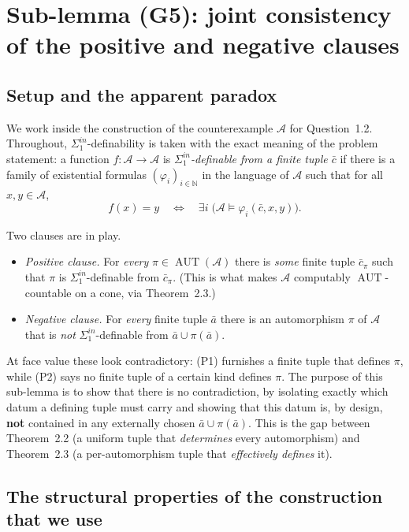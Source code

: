 \documentclass[12pt,fullpage]{article}
\theoremstyle{definition}
\newcommand{\A}{\mathcal{A}}
\newcommand{\N}{\mathbb{N}}
\newcommand{\AUT}{\operatorname{AUT}}
\renewcommand{\phi}{\varphi}
\begin{document}
\section*{Sub-lemma (G5): joint consistency of the positive and negative clauses}

\subsection*{Setup and the apparent paradox}

We work inside the construction of the counterexample $\A$ for
Question~1.2.  Throughout, $\Sigma^{in}_1$-definability is taken with the
exact meaning of the problem statement: a function $f\colon\A\to\A$ is
\emph{$\Sigma^{in}_1$-definable from a finite tuple $\bar c$} if there is a
family of existential formulas $(\phi_i)_{i\in\N}$ in the language of $\A$
such that for all $x,y\in\A$,
\[
f(x)=y\quad\Longleftrightarrow\quad \exists i\;\bigl(\A\models\phi_i(\bar c,x,y)\bigr).
\tag{$\ast$}
\]

Two clauses are in play.

\begin{itemize}
\item[(P1)] \emph{Positive clause.} For \emph{every} $\pi\in\AUT(\A)$ there
  is \emph{some} finite tuple $\bar c_\pi$ such that $\pi$ is
  $\Sigma^{in}_1$-definable from $\bar c_\pi$.  (This is what makes $\A$
  computably $\AUT$-countable on a cone, via Theorem~2.3.)
\item[(P2)] \emph{Negative clause.} For \emph{every} finite tuple $\bar a$
  there is an automorphism $\pi$ of $\A$ that is \emph{not}
  $\Sigma^{in}_1$-definable from $\bar a\cup\pi(\bar a)$.
\end{itemize}

At face value these look contradictory: (P1) furnishes a finite tuple that
defines $\pi$, while (P2) says no finite tuple of a certain kind defines
$\pi$.  The purpose of this sub-lemma is to show that there is no
contradiction, by isolating exactly which datum a defining tuple must carry
and showing that this datum is, by design, \textbf{not} contained in any
externally chosen $\bar a\cup\pi(\bar a)$.  This is the gap between
Theorem~2.2 (a uniform tuple that \emph{determines} every automorphism) and
Theorem~2.3 (a per-automorphism tuple that \emph{effectively defines} it).

\subsection*{The structural properties of the construction that we use}
\end{document}
